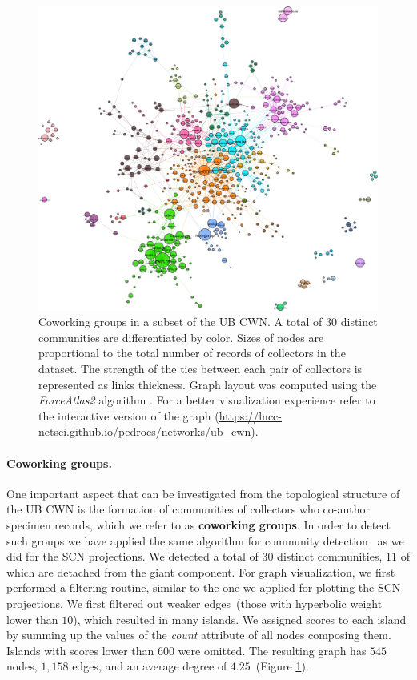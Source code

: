 \begin{figure}[h!]
  	\centering
    \includegraphics[width=\linewidth]{figures/casestudy_ub/cwn_communities.pdf}
    \caption[Coworking groups in the UB CWN]{ Coworking groups in a subset of the UB CWN. A total of $30$ distinct communities are differentiated by color. Sizes of nodes are proportional to the total number of records of collectors in the dataset. The strength of the ties between each pair of collectors is represented as links thickness. Graph layout was computed using the \textit{ForceAtlas2} algorithm \cite{Jacomy2014}. For a better visualization experience refer to the interactive version of the graph (\url{https://lncc-netsci.github.io/pedrocs/networks/ub_cwn}).}
    \label{fig:ub_cwn_communities}
\end{figure}

\paragraph{Coworking groups.}

One important aspect that can be investigated from the topological structure of the UB CWN is the formation of communities of collectors who co-author specimen records, which we refer to as \textbf{coworking groups}. 
%
In order to detect such groups we have applied the same algorithm for community detection~\cite{Blondel2008} as we did for the SCN projections.
%
We detected a total of $30$ distinct communities, $11$ of which are detached from the giant component.
%
For graph visualization, we first performed a filtering routine, similar to the one we applied for plotting the SCN projections. 
We first filtered out weaker edges~(those with hyperbolic weight lower than $10$), which resulted in many islands. We assigned scores to each island by summing up the values of the \textit{count} attribute of all nodes composing them. 
Islands with scores lower than $600$ were omitted.
The resulting graph has $545$ nodes, $1,158$ edges, and an average degree of $4.25$~(Figure \ref{fig:ub_cwn_communities}).

